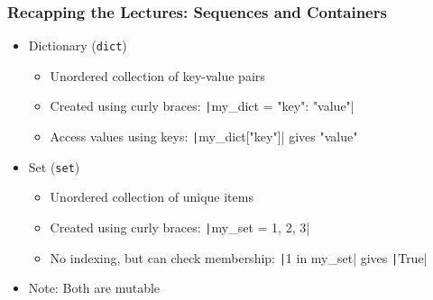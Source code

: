 \documentclass{beamer}
\begin{document}
\begin{frame}
    \frametitle{Recapping the Lectures: Sequences and Containers}
    \begin{itemize}
        \item Dictionary (\texttt{dict})
              \begin{itemize}
                  \item Unordered collection of key-value pairs
                  \item Created using curly braces: \texttt|my_dict = {"key": "value"}|
                  \item Access values using keys: \texttt|my_dict["key"]| gives "value"
              \end{itemize}
        \item Set (\texttt{set})
              \begin{itemize}
                  \item Unordered collection of unique items
                  \item Created using curly braces: \texttt|my_set = {1, 2, 3}|
                  \item No indexing, but can check membership: \texttt|1 in my_set| gives \texttt|True|
              \end{itemize}
        \item Note: Both are mutable
    \end{itemize}
\end{frame}
\end{document}
